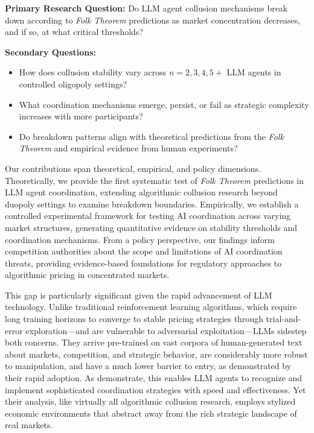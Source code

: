 \textbf{Primary Research Question:} Do LLM agent collusion mechanisms break down according to \emph{Folk Theorem} predictions as market concentration decreases, and if so, at what critical thresholds?

\textbf{Secondary Questions:}
\begin{itemize}
    \item How does collusion stability vary across $n = 2, 3, 4, 5+$ LLM agents in controlled oligopoly settings?
    \item What coordination mechanisms emerge, persist, or fail as strategic complexity increases with more participants?
    \item Do breakdown patterns align with theoretical predictions from the \emph{Folk Theorem} and empirical evidence from human experiments?
\end{itemize}

Our contributions span theoretical, empirical, and policy dimensions. Theoretically, we provide the first systematic test of \emph{Folk Theorem} predictions in LLM agent coordination, extending algorithmic collusion research beyond duopoly settings to examine breakdown boundaries. Empirically, we establish a controlled experimental framework for testing AI coordination across varying market structures, generating quantitative evidence on stability thresholds and coordination mechanisms. From a policy perspective, our findings inform competition authorities about the scope and limitations of AI coordination threats, providing evidence-based foundations for regulatory approaches to algorithmic pricing in concentrated markets.

This gap is particularly significant given the rapid advancement of LLM technology. Unlike traditional reinforcement learning algorithms, which require long training horizons to converge to stable pricing strategies through trial-and-error exploration—and are vulnerable to adversarial exploitation—LLMs sidestep both concerns. They arrive pre-trained on vast corpora of human-generated text about markets, competition, and strategic behavior, are considerably more robust to manipulation, and have a much lower barrier to entry, as demonstrated by their rapid adoption. As \textcite{fish_algorithmic_2025} demonstrate, this enables LLM agents to recognize and implement sophisticated coordination strategies with speed and effectiveness. Yet their analysis, like virtually all algorithmic collusion research, employs stylized economic environments that abstract away from the rich strategic landscape of real markets.

